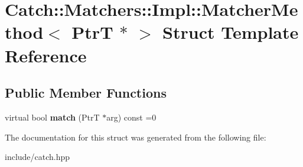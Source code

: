 \hypertarget{structCatch_1_1Matchers_1_1Impl_1_1MatcherMethod_3_01PtrT_01_5_01_4}{}\section{Catch\+:\+:Matchers\+:\+:Impl\+:\+:Matcher\+Method$<$ PtrT $\ast$ $>$ Struct Template Reference}
\label{structCatch_1_1Matchers_1_1Impl_1_1MatcherMethod_3_01PtrT_01_5_01_4}
\subsection*{Public Member Functions}
\begin{DoxyCompactItemize}
\item 
virtual bool {\bfseries match} (PtrT $\ast$arg) const =0\hypertarget{structCatch_1_1Matchers_1_1Impl_1_1MatcherMethod_3_01PtrT_01_5_01_4_a5fdd64f9509724f32ffc73cb320181d1}{}\label{structCatch_1_1Matchers_1_1Impl_1_1MatcherMethod_3_01PtrT_01_5_01_4_a5fdd64f9509724f32ffc73cb320181d1}

\end{DoxyCompactItemize}


The documentation for this struct was generated from the following file\+:\begin{DoxyCompactItemize}
\item 
include/catch.\+hpp\end{DoxyCompactItemize}
